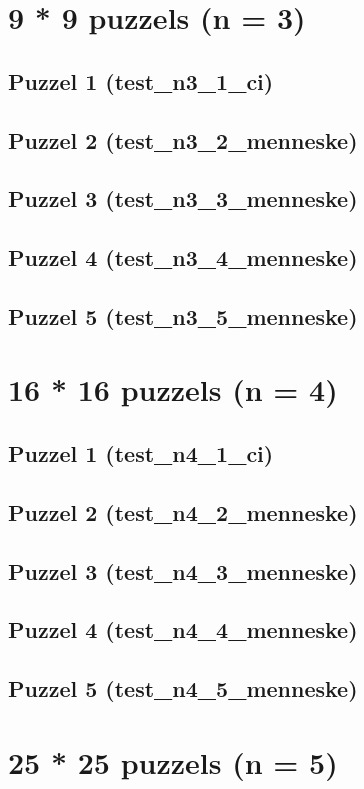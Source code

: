 \documentclass[]{report}
\begin{document}
\begin{appendices}
\section{9 * 9 puzzels (n = 3)}
\subsection{Puzzel 1 (test\_n3\_1\_ci)}

\subsection{Puzzel 2 (test\_n3\_2\_menneske)}
\subsection{Puzzel 3 (test\_n3\_3\_menneske)}
\subsection{Puzzel 4 (test\_n3\_4\_menneske)}
\subsection{Puzzel 5 (test\_n3\_5\_menneske)}
\section{16 * 16 puzzels (n = 4)}
\subsection{Puzzel 1 (test\_n4\_1\_ci)}

\subsection{Puzzel 2 (test\_n4\_2\_menneske)}
\subsection{Puzzel 3 (test\_n4\_3\_menneske)}
\subsection{Puzzel 4 (test\_n4\_4\_menneske)}
\subsection{Puzzel 5 (test\_n4\_5\_menneske)}
\section{25 * 25 puzzels (n = 5)}

\end{appendices}
\end{document}
